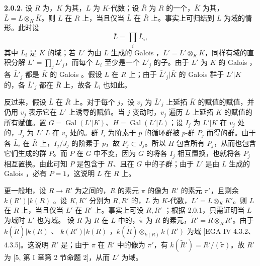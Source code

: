 \textbf{2.0.2.} 设 $R$ 为，$K$ 为其，$L$ 为 $K$-代数；设 $\bar R$ 为 $R$ 的一个，$\bar K$ 为其，$\bar L=L\otimes_K\bar K$。则 $L$ 在 $R$ 上，当且仅当 $\bar L$ 在 $\bar R$ 上。事实上可归结到 $L$ 为域的情形。此时设
\[\bar L=\prod_i\bar L_i,\]
其中 $\bar L_i$ 是 $\bar K$ 的域；若 $L'$ 为由 $L$ 生成的 Galois ，$\bar L'=L'\otimes_K\bar K$，同样有域的直积分解 $\bar L'=\prod_j\bar L'_j$，而每个 $\bar L_i$ 至少是一个 $\bar L'_j$ 的子。由于 $L'$ 为 $K$ 的 Galois ，各 $\bar L'_j$ 都是 $\bar K$ 的 Galois 。假设 $L$ 在 $R$ 上；由于 $\bar L'_j|\bar K$ 的 Galois 群于 $L'|K$ 的，各 $\bar L'_j$ 都在 $\bar R$ 上，故各 $\bar L_i$ 也如此。

反过来，假设 $\bar L$ 在 $\bar R$ 上。对于每个 $j$，设 $v_j$ 为 $\bar L'_j$ 上延拓 $\bar K$ 的赋值的赋值，并仍用 $v_j$ 表示它在 $L'$ 上诱导的赋值。当 $j$ 变动时，$v_j$ 遍历 $L$ 上延拓 $K$ 的赋值的所有赋值。置 $G=\operatorname{Gal}(L'|K)$、$H=\operatorname{Gal}(L'|L)$；设 $I_j$ 为 $L'|K$ 在 $v_j$ 处的，$J_j$ 为 $L'|L$ 在 $v_j$ 处的。群 $I_i$ 为阶素于 $p$ 的循环群被 $p$-群 $P_j$ 而得的群。由于各 $\bar L_i$ 在 $\bar R$ 上，$I_j/J_j$ 的阶素于 $p$，故 $P_j\subset J_j$。所以 $H$ 包含所有 $P_j$，从而也包含它们生成的群 $P$。而 $P$ 在 $G$ 中不变，因为 $G$ 的将各 $I_j$ 相互置换，也就将各 $P_j$ 相互置换。由此可知 $P$ 是包含于 $H$、且在 $G$ 中的子群；由于 $L'$ 是由 $L$ 生成的 Galois ，必有 $P=1$，这说明 $L$ 在 $R$ 上。

更一般地，设 $R\to R'$ 为之间的，$R$ 的素元 $\pi$ 的像为 $R'$ 的素元 $\pi'$，且剩余 $k(R')|k(R)$ 。设 $K,K'$ 分别为 $R,R'$ 的，$L$ 为 $K$-代数，$L'=L\otimes_K K'$。则 $L$ 在 $R$ 上，当且仅当 $L'$ 在 $R'$ 上。事实上可设 $R,R'$ ；根据 2.0.1，只需证明当 $L$ 为域时 $L'$ 也为域。
设 $\widetilde R$ 为 $R$ 在 $L$ 中的，$\widetilde\pi$ 为 $\widetilde R$ 的素元，$\widetilde R'=\widetilde R\otimes_RR'$。由于 $k(\widetilde R)|k(R)$ 、 $k(R')|k(R)$ ，$k(\widetilde R)\otimes_{k(R)}k(R')$ 为域 [EGA IV 4.3.2、4.3.5]。这说明 $R'$ 是；由于 $\pi$ 在 $R'$ 中的像为 $\pi'$，有 $k(\widetilde R')=R'/(\widetilde\pi)$。故 $R'$ 为 [5, 第 I 章第 2 节命题 2]，从而 $L'$ 为域。

